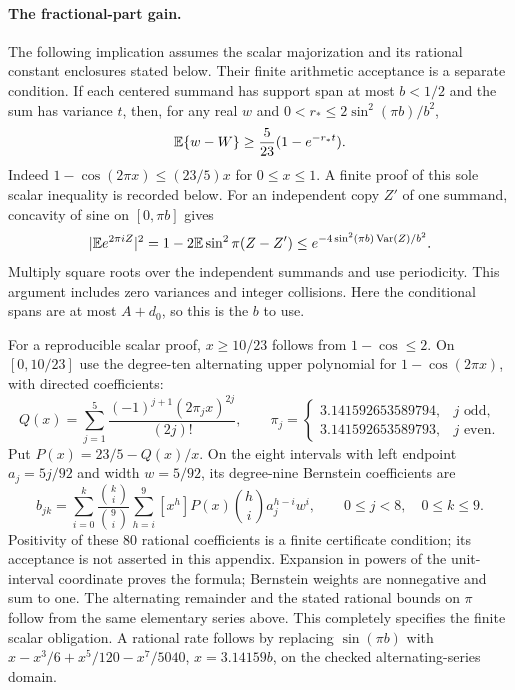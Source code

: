 \paragraph{The fractional-part gain.}
The following implication assumes the scalar majorization and its rational
constant enclosures stated below. Their finite arithmetic acceptance is a
separate condition.
If each centered summand has support span at most $b<1/2$ and the sum has
variance $t$, then, for any real $w$ and
$0<r_*\le2\sin^2(\pi b)/b^2$,
\begin{equation}\label{ms:fourier:cut49:shortloc:harmonic}
             \mathbb E\{w-W\}\ge\frac5{23}(1-e^{-r_*t}).
\end{equation}
Indeed $1-\cos(2\pi x)\le(23/5)x$ for $0\le x\le1$.
A finite proof of this sole scalar inequality is recorded below.
For an independent copy $Z'$ of one summand, concavity of sine on
$[0,\pi b]$ gives
\[
 |\mathbb E e^{2\pi iZ}|^2
 =1-2\mathbb E\sin^2\pi(Z-Z')
 \le e^{-4\sin^2(\pi b)\operatorname{Var}(Z)/b^2}.
\]
Multiply square roots over the independent summands and use periodicity.
This argument includes zero variances and integer collisions.
Here the conditional spans are at most $A+d_0$, so this is the $b$ to use.

For a reproducible scalar proof, $x\ge10/23$ follows from $1-\cos\le2$.
On $[0,10/23]$ use the degree-ten alternating upper polynomial for
$1-\cos(2\pi x)$, with directed coefficients:
\[
 Q(x)=\sum_{j=1}^5\frac{(-1)^{j+1}(2\pi_jx)^{2j}}{(2j)!},\qquad
 \pi_j=\begin{cases}3.141592653589794,&j\text{ odd},\\
                       3.141592653589793,&j\text{ even}.\end{cases}
\]
Put
$P(x)=23/5-Q(x)/x$. On the eight intervals with left endpoint $a_j=5j/92$
and width $w=5/92$, its degree-nine Bernstein coefficients are
\[
 b_{jk}=\sum_{i=0}^k\frac{\binom ki}{\binom9i}
           \sum_{h=i}^9[x^h]P(x)\binom hi a_j^{h-i}w^i,
 \qquad 0\le j<8,\quad0\le k\le9.
\]
Positivity of these 80 rational coefficients is a finite certificate
condition; its acceptance is not asserted in this appendix. Expansion in powers of the unit-interval coordinate
proves the formula; Bernstein weights are nonnegative and sum to one.
The alternating remainder and the stated rational bounds on $\pi$ follow
from the same elementary series above. This completely specifies the
finite scalar obligation. A rational rate follows by replacing
$\sin(\pi b)$ with $x-x^3/6+x^5/120-x^7/5040$, $x=3.14159b$, on the
checked alternating-series domain.

